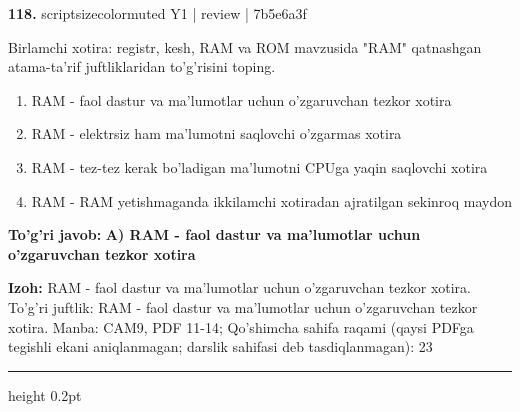 \documentclass[10pt,a4paper]{article}
\begin{document}
{\bfseries\sffamily\color{ink} 118.} {scriptsizecolor{muted} Y1 | review | 7b5e6a3f}
\par
Birlamchi xotira: registr, kesh, RAM va ROM mavzusida "RAM" qatnashgan atama-ta'rif juftliklaridan to'g'risini toping.
\begin{enumerate}[label=\Alph*),leftmargin=9mm]
\item RAM - faol dastur va ma'lumotlar uchun o'zgaruvchan tezkor xotira
\item RAM - elektrsiz ham ma'lumotni saqlovchi o'zgarmas xotira
\item RAM - tez-tez kerak bo'ladigan ma'lumotni CPUga yaqin saqlovchi xotira
\item RAM - RAM yetishmaganda ikkilamchi xotiradan ajratilgan sekinroq maydon
\end{enumerate}
\begin{tcolorbox}[enhanced,breakable,colback=teal!4,colframe=teal!60!black,boxrule=0.45pt,arc=1.2mm,left=2.7mm,right=2.7mm,top=1.8mm,bottom=1.8mm,before skip=2mm,after skip=2mm]
{\bfseries\sffamily\color{teal}To'g'ri javob:} \textbf{A) RAM - faol dastur va ma'lumotlar uchun o'zgaruvchan tezkor xotira}
\par\smallskip
{\bfseries Izoh:} RAM - faol dastur va ma'lumotlar uchun o'zgaruvchan tezkor xotira. To'g'ri juftlik: RAM - faol dastur va ma'lumotlar uchun o'zgaruvchan tezkor xotira. Manba: CAM9, PDF 11-14; Qo'shimcha sahifa raqami (qaysi PDFga tegishli ekani aniqlanmagan; darslik sahifasi deb tasdiqlanmagan): 23
\end{tcolorbox}
\vspace{2mm}\hrule height 0.2pt\vspace{3mm}
\end{document}
